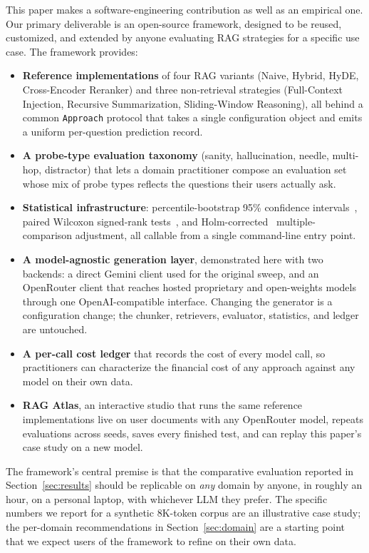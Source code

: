 \documentclass[conference,a4paper,10pt]{IEEEtran}
\begin{document}
This paper makes a software-engineering contribution as well as an empirical one.
Our primary deliverable is an open-source framework, designed to be reused, customized, and extended by anyone evaluating RAG strategies for a specific use case.
The framework provides:

\begin{itemize}
    \item \textbf{Reference implementations} of four RAG variants (Naive, Hybrid, HyDE, Cross-Encoder Reranker) and three non-retrieval strategies (Full-Context Injection, Recursive Summarization, Sliding-Window Reasoning), all behind a common \texttt{Approach} protocol that takes a single configuration object and emits a uniform per-question prediction record.
    \item \textbf{A probe-type evaluation taxonomy} (sanity, hallucination, needle, multi-hop, distractor) that lets a domain practitioner compose an evaluation set whose mix of probe types reflects the questions their users actually ask.
    \item \textbf{Statistical infrastructure}: percentile-bootstrap 95\% confidence intervals~\cite{efron1979bootstrap}, paired Wilcoxon signed-rank tests~\cite{wilcoxon1945}, and Holm-corrected~\cite{holm1979} multiple-comparison adjustment, all callable from a single command-line entry point.
    \item \textbf{A model-agnostic generation layer}, demonstrated here with two backends: a direct Gemini client used for the original sweep, and an OpenRouter client that reaches hosted proprietary and open-weights models through one OpenAI-compatible interface. Changing the generator is a configuration change; the chunker, retrievers, evaluator, statistics, and ledger are untouched.
    \item \textbf{A per-call cost ledger} that records the cost of every model call, so practitioners can characterize the financial cost of any approach against any model on their own data.
    \item \textbf{RAG Atlas}, an interactive studio that runs the same reference implementations live on user documents with any OpenRouter model, repeats evaluations across seeds, saves every finished test, and can replay this paper's case study on a new model.
\end{itemize}

The framework's central premise is that the comparative evaluation reported in Section~\ref{sec:results} should be replicable on \emph{any} domain by anyone, in roughly an hour, on a personal laptop, with whichever LLM they prefer.
The specific numbers we report for a synthetic 8K-token corpus are an illustrative case study; the per-domain recommendations in Section~\ref{sec:domain} are a starting point that we expect users of the framework to refine on their own data.
\end{document}
